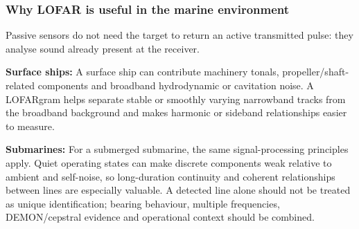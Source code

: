 \subsubsection{Why LOFAR is useful in the marine environment}

Passive sensors do not need the target to return an active transmitted pulse: they analyse sound already present at the receiver.

\textbf{Surface ships: }A surface ship can contribute machinery tonals, propeller/shaft-related components and broadband hydrodynamic or cavitation noise. A LOFARgram helps separate stable or smoothly varying narrowband tracks from the broadband background and makes harmonic or sideband relationships easier to measure.

\textbf{Submarines: }For a submerged submarine, the same signal-processing principles apply. Quiet operating states can make discrete components weak relative to ambient and self-noise, so long-duration continuity and coherent relationships between lines are especially valuable. A detected line alone should not be treated as unique identification; bearing behaviour, multiple frequencies, DEMON/cepstral evidence and operational context should be combined.

